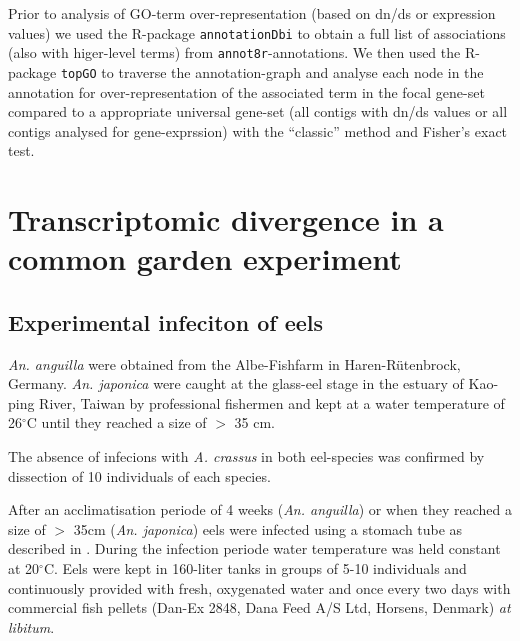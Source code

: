 Prior to analysis of GO-term over-representation (based on dn/ds or
expression values) we used the R-package \texttt{annotationDbi}
\cite{AnnotationDbi} to obtain a full list of associations (also with
higer-level terms) from \texttt{annot8r}-annotations. We then used the
R-package \texttt{topGO} \cite{topGO} to traverse the annotation-graph
and analyse each node in the annotation for over-representation of the
associated term in the focal gene-set compared to a appropriate
universal gene-set (all contigs with dn/ds values or all contigs
analysed for gene-exprssion) with the ``classic'' method and Fisher's
exact test.

\section{Transcriptomic divergence in a common garden experiment}

\subsection{Experimental infeciton of eels} 

\textit{An. anguilla} were obtained from the Albe-Fishfarm in
Haren-R\"utenbrock, Germany. \textit{An. japonica} were caught at the
glass-eel stage in the estuary of Kao-ping River, Taiwan by
professional fishermen and kept at a water temperature of
26$^{\circ}$C until they reached a size of $>$ 35 cm.

The absence of infecions with \textit{A. crassus} in both eel-species
was confirmed by dissection of 10 individuals of each species.

After an acclimatisation periode of 4 weeks (\textit{An. anguilla}) or
when they reached a size of $>$ 35cm (\textit{An. japonica}) eels were
infected using a stomach tube as described in
\cite{boon1990effect}. During the infection periode water temperature
was held constant at 20$^{\circ}$C. Eels were kept in 160-liter tanks
in groups of 5-10 individuals and continuously provided with fresh,
oxygenated water and once every two days with commercial fish pellets
(Dan-Ex 2848, Dana Feed A/S Ltd, Horsens, Denmark) \textit{at
  libitum}.

